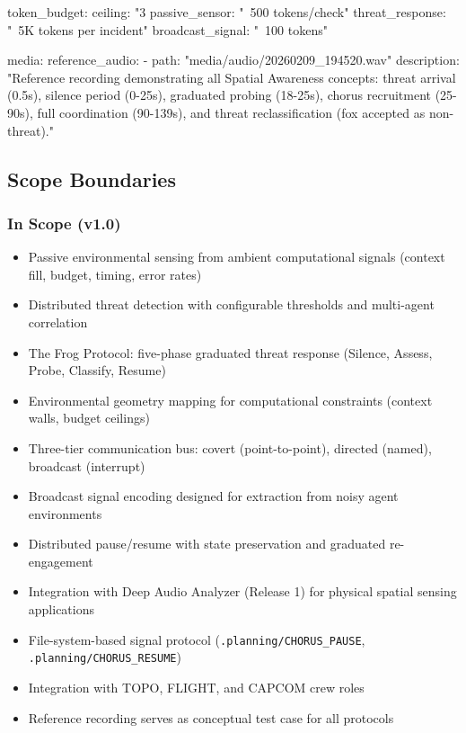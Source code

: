 \documentclass[11pt,letterpaper]{article}
\begin{document}
\begin{asciibox}
token_budget:
  ceiling: "3%
  passive_sensor: "~500 tokens/check"
  threat_response: "~5K tokens per incident"
  broadcast_signal: "~100 tokens"

media:
  reference_audio:
    - path: "media/audio/20260209_194520.wav"
      description: "Reference recording demonstrating all
                     Spatial Awareness concepts: threat
                     arrival (0.5s), silence period (0-25s),
                     graduated probing (18-25s), chorus
                     recruitment (25-90s), full coordination
                     (90-139s), and threat reclassification
                     (fox accepted as non-threat)."
\end{asciibox}

\subsection{Scope Boundaries}

\subsubsection{In Scope (v1.0)}

\begin{itemize}[leftmargin=2em]
\item Passive environmental sensing from ambient computational signals (context fill, budget, timing, error rates)
\item Distributed threat detection with configurable thresholds and multi-agent correlation
\item The Frog Protocol: five-phase graduated threat response (Silence, Assess, Probe, Classify, Resume)
\item Environmental geometry mapping for computational constraints (context walls, budget ceilings)
\item Three-tier communication bus: covert (point-to-point), directed (named), broadcast (interrupt)
\item Broadcast signal encoding designed for extraction from noisy agent environments
\item Distributed pause/resume with state preservation and graduated re-engagement
\item Integration with Deep Audio Analyzer (Release 1) for physical spatial sensing applications
\item File-system-based signal protocol (\texttt{.planning/CHORUS\_PAUSE}, \texttt{.planning/CHORUS\_RESUME})
\item Integration with TOPO, FLIGHT, and CAPCOM crew roles
\item Reference recording serves as conceptual test case for all protocols
\end{itemize}
\end{document}
